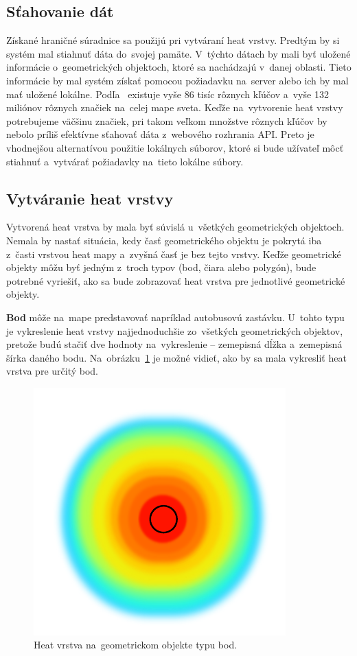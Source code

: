 \subsection*{Sťahovanie dát}
Získané hraničné súradnice sa použijú pri vytváraní heat vrstvy. Predtým by si systém mal stiahnuť dáta do~svojej pamäte. V~týchto dátach by mali byť uložené informácie o~geometrických objektoch, ktoré sa nachádzajú v~danej oblasti. Tieto informácie by mal systém získať pomocou požiadavku na~server alebo ich by mal mať uložené lokálne. Podľa~\cite{openstreet-stats} existuje vyše 86 tisíc rôznych kľúčov a~vyše 132 miliónov rôznych značiek na~celej mape sveta. Keďže na~vytvorenie heat vrstvy potrebujeme väčšinu značiek, pri takom veľkom množstve rôznych kľúčov by nebolo príliš efektívne sťahovať dáta z~webového rozhrania API. Preto je vhodnejšou alternatívou použitie lokálnych súborov, ktoré si bude užívateľ môcť stiahnuť a~vytvárať požiadavky na~tieto lokálne súbory.

\subsection*{Vytváranie heat vrstvy}
Vytvorená heat vrstva by mala byť súvislá u~všetkých geometrických objektoch. Nemala by nastať situácia, kedy časť geometrického objektu je pokrytá iba z~časti vrstvou heat mapy a~zvyšná časť je bez tejto vrstvy. Keďže geometrické objekty môžu byť jedným z~troch typov (bod, čiara alebo polygón), bude potrebné vyriešiť, ako sa bude zobrazovať heat vrstva pre jednotlivé geometrické objekty.

\textbf{Bod} môže na~mape predstavovať napríklad autobusovú zastávku. U~tohto typu je vykreslenie heat vrstvy najjednoduchšie zo~všetkých geometrických objektov, pretože budú stačiť dve hodnoty na~vykreslenie \--- zemepisná dĺžka a~zemepisná šírka daného bodu. Na~obrázku~\ref{fig:heat-point} je možné vidieť, ako by sa mala vykresliť heat vrstva pre určitý bod.

\begin{figure}[ht]
    \centering
    \includegraphics[width=0.3\linewidth]{obrazky-figures/heat-point.pdf}
    \caption{Heat vrstva na~geometrickom objekte typu bod.}
    \label{fig:heat-point}
\end{figure}


